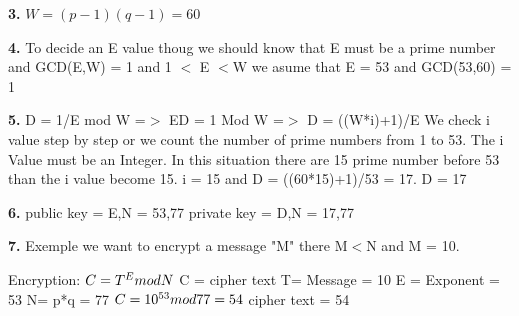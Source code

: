 \documentclass{article}
\begin{document}
        \textbf{3.}\newline
        \begin{math}
         W = (p-1)(q-1) = 60
        \end{math}\newline
        
        \textbf{4.}\newline
        To decide an E value thoug we should know that E must be a prime number and GCD(E,W) = 1  and 1 $<$ E $<$W
        we asume that E = 53 and GCD(53,60) = 1\newline
        
        \textbf{5.}\newline
         D = 1/E mod W =$>$ ED = 1 Mod W  =$>$ D = ((W*i)+1)/E\newline
        We check i value step by step or we count the number of prime numbers from 1 to 53. The i Value must be an Integer.
        In this situation there are 15 prime number before 53 than the i value become 15.\newline
        i = 15 and D = ((60*15)+1)/53 = 17.  D = 17\newline
        
        \textbf{6.}\newline
        public key = {E,N} = {53,77}\newline   
        private key = {D,N} = {17,77}\newline
        
        \textbf{7.}\newline
        Exemple we want to encrypt a message "M" there M$<$N and  M = 10.\newline
        
        Encryption:\newline
        \begin{math}
            C = T ^ E mod N \newline 
        \end{math}
            C = cipher text\newline
            T= Message = 10\newline
            E = Exponent = 53\newline
            N= p*q = 77\newline
        \begin{math}
            C = 10^{53}mod77  = 54\newline 
        \end{math}
            cipher text = 54\newline
        
\end{document}
